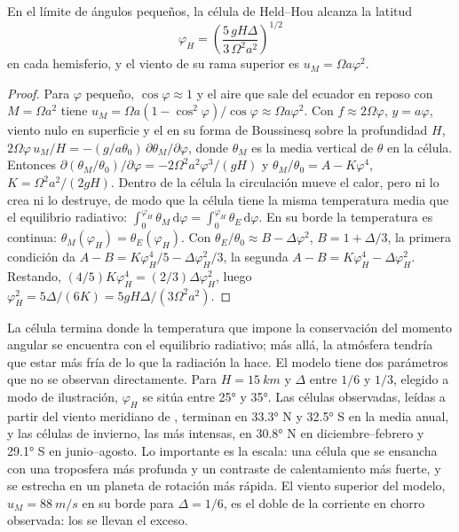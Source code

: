 \begin{theorem}\label{thm:b3:atmospheric-dynamics:held-hou}
En el límite de ángulos pequeños, la célula de Held--Hou alcanza la latitud
\[
\varphi_H = \left(\frac{5\,gH\Delta}{3\,\Omega^2a^2}\right)^{1/2}
\]
en cada hemisferio, y el viento de su rama superior es $u_M = \Omega
a\varphi^2$.
\end{theorem}

\begin{proof}
Para $\varphi$ pequeño, $\cos\varphi \approx 1$ y el aire que sale del ecuador en
reposo con $M = \Omega a^2$ tiene $u_M = \Omega a(1 - \cos^2\varphi)/\cos\varphi
\approx \Omega a\varphi^2$. Con $f \approx 2\Omega\varphi$, $y = a\varphi$,
viento nulo en superficie y el  en su forma de Boussinesq sobre la
profundidad $H$, $2\Omega\varphi\,u_M/H = -(g/a\theta_0)\,\partial\theta_M/
\partial\varphi$, donde $\theta_M$ es la media vertical de $\theta$ en la
célula. Entonces $\partial(\theta_M/\theta_0)/\partial\varphi = -2\Omega^2a^2
\varphi^3/(gH)$ y $\theta_M/\theta_0 = A - K\varphi^4$, $K = \Omega^2a^2/
(2gH)$. Dentro de la célula la circulación mueve el calor, pero ni lo crea ni
lo destruye, de modo que la célula tiene la misma temperatura media que
el equilibrio radiativo: $\int_0^{\varphi_H}\theta_M\,\mathrm d\varphi = \int_0^{\varphi_H}
\theta_E\,\mathrm d\varphi$. En su borde la temperatura es continua:
$\theta_M(\varphi_H) = \theta_E(\varphi_H)$. Con $\theta_E/\theta_0 \approx
B - \Delta\varphi^2$, $B = 1 + \Delta/3$, la primera condición da $A - B =
K\varphi_H^4/5 - \Delta\varphi_H^2/3$, la segunda $A - B = K\varphi_H^4 -
\Delta\varphi_H^2$. Restando, $(4/5)K\varphi_H^4 = (2/3)\Delta
\varphi_H^2$, luego $\varphi_H^2 = 5\Delta/(6K) = 5gH\Delta/(3\Omega^2a^2)$.
\end{proof}

La célula termina donde la temperatura que impone la conservación del momento angular
se encuentra con el equilibrio radiativo; más allá, la atmósfera tendría que estar
más fría de lo que la radiación la hace. El modelo tiene dos parámetros que
no se observan directamente. Para $H = \qty{15}{km}$ y $\Delta$ entre $1/6$ y
$1/3$, elegido a modo de ilustración, $\varphi_H$ se sitúa entre \ang{25} y \ang{35}. Las
células observadas, leídas a partir del viento meridiano de , terminan en
\ang{33.3} N y \ang{32.5} S en la media anual, y las células de invierno,
las más intensas, en \ang{30.8} N en diciembre--febrero y \ang{29.1} S en
junio--agosto. Lo importante es la escala: una célula que se ensancha con una
troposfera más profunda y un contraste de calentamiento más fuerte, y se estrecha en un
planeta de rotación más rápida. El viento superior del modelo, $u_M =
\qty{88}{m/s}$ en su borde para $\Delta = 1/6$, es el doble de la corriente en chorro observada:
los  se llevan el exceso.

